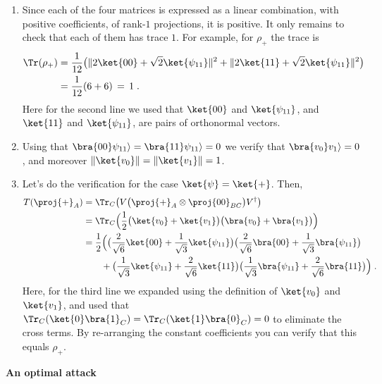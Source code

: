 \begin{exercises}
\begin{enumerate}
\item Since each of the four matrices is expressed as a linear combination, with positive coefficients, of rank-$1$ projections, it is positive. It only remains to check that each of them has trace $1$. For example, for $\rho_+$ the trace is 
\begin{align*}
 \Tr(\rho_+) &= \frac{1}{12} \big(\| 2 \ket{00} + \sqrt{2} \ket{\psi_{11}}\|^2 +\| 2 \ket{11} + \sqrt{2} \ket{\psi_{11}}\|^2 \big) \\
&= \frac{1}{12} (6+6)\,=\,1\;.
\end{align*}
Here for the second line we used that $\ket{00}$ and $\ket{\psi_{11}}$, and $\ket{11}$ and $\ket{\psi_{11}}$, are pairs of orthonormal vectors. 
\item Using that $\bra{00}\psi_{11}\rangle = \bra{11}\psi_{11}\rangle = 0$ we verify that 
$\bra{v_0}v_1\rangle =0$, and moreover $\|\ket{v_0}\|=\|\ket{v_1}\|=1$.
\item  Let's do the verification for the case $\ket{\psi}=\ket{+}$. Then,
\begin{align*}
T(\proj{+}_A) &= \Tr_C \big( V\big( \proj{+}_A \otimes \proj{00}_{BC} \big) V^\dagger \big)\\
&= \Tr_C \Big( \frac{1}{2}\big( \ket{v_0}+\ket{v_1} \big) \big( \bra{v_0} + \bra{v_1} \big) \Big)\\
&= \frac{1}{2} \Big( \big(\frac{2}{\sqrt{6}} \ket{00} + \frac{1}{\sqrt{3}} \ket{\psi_{11}} \big)\big(\frac{2}{\sqrt{6}} \bra{00} + \frac{1}{\sqrt{3}} \bra{\psi_{11}}\big) \\
&\qquad + \big(\frac{1}{\sqrt{3}} \ket{\psi_{11}} +\frac{2}{\sqrt{6}} \ket{11} \big)\big( \frac{1}{\sqrt{3}} \bra{\psi_{11}}+\frac{2}{\sqrt{6}} \bra{11} \big) \Big)\;.
\end{align*}
Here, for the third line we expanded using the definition of $\ket{v_0}$ and $\ket{v_1}$, and used that $\Tr_C(\ket{0}\bra{1}_C)=\Tr_C(\ket{1}\bra{0}_C)=0$ to eliminate the cross terms. 
By re-arranging the constant coefficients you can verify that this equals $\rho_+$. 

\end{enumerate}


\item {\bf An optimal attack}\label{ex:opt-wiesner}
 

\end{exercises}
